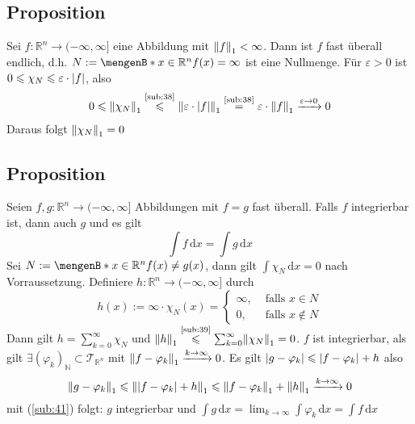 \subsection[\protect{Proposition: $f$ mit $\norm[1]{f}< \infty $ ist fast überall endlich}]{Proposition} %
\label{sub:58}
Sei $f : \mathds{R}^n \to (-\infty, \infty]$ eine Abbildung mit $\norm[1]{f}< \infty $. Dann ist $f$ fast überall endlich, d.h. $N:= \set[x \in \mathds{R}^n]{f(x)=\infty} $
ist eine Nullmenge.
Für $\varepsilon >0 $ ist $0\le \chi_N\le \varepsilon \cdot \abs*{f} $, also
\begin{align*}
	0 \le \norm[1]{\chi_N} \stackrel{\text{\ref{sub:38}}}{\le} \norm[1]{\varepsilon \cdot \abs*{f} } \stackrel{\text{\ref{sub:38}}}{=} \varepsilon \cdot \norm[1]{f}
	\xrightarrow{\varepsilon \to 0} 0   
\end{align*}
Daraus folgt $\norm[1]{\chi_N} =0 $ \bewende

\subsection[Proposition: Die Integrale fast gleicher Funktionen stimmen überein]{Proposition} %
\label{sub:59}
Seien $f,g : \mathds{R}^n \to (-\infty, \infty]$ Abbildungen mit $f=g$ fast überall. Falls $f$ integrierbar ist, dann auch $g$ und es gilt 
\[
	\int\! f  \, \mathrm{d}x  = \int\! g  \, \mathrm{d}x 
\]
Sei $N := \set[x \in \mathds{R}^n]{f(x)\not= g(x)} $, dann gilt $\int\! \chi_N  \, \mathrm{d}x =0$ nach Vorraussetzung. Definiere $h : \mathds{R}^n \to (-\infty, \infty]$
durch 
\[
	h(x) := \infty \cdot \chi_N(x) = \begin{cases}
		\infty, &\text{ falls }x \in N\\
		0 , &\text{ falls } x \not\in N
	\end{cases}
\]
Dann gilt $h = \sum_{k=0}^{\infty} \chi_N$ und $\norm[1]{h} \stackrel{\text{\ref{sub:39}}}{\le} \sum_{k=0}^{\infty} \norm[1]{\chi_N} = 0  $. $f$ ist integrierbar, als gilt
$\exists (\varphi_k)_\mathds{N} \subset \mathcal{T}_{\mathds{R}^n}$ mit $\norm[1]{f- \varphi_k} \xrightarrow{k \to \infty} 0 $. Es gilt 
$\abs*{g - \varphi_k} \le   \abs*{f- \varphi_k} +h$ also 
\[
	\norm[1]{g- \varphi_k} \le \norm[1]{\abs*{f- \varphi_k} +h } \le \norm[1]{f- \varphi_k} + \norm[1]{h} \xrightarrow{k \to \infty} 0    
\]
mit (\ref{sub:41}) folgt: $g$ integrierbar und $\int\! g  \, \mathrm{d}x  = \lim_{ k \to \infty} \int\! \varphi_k  \, \mathrm{d}x = \int\! f  \, \mathrm{d}x $ \bewende

